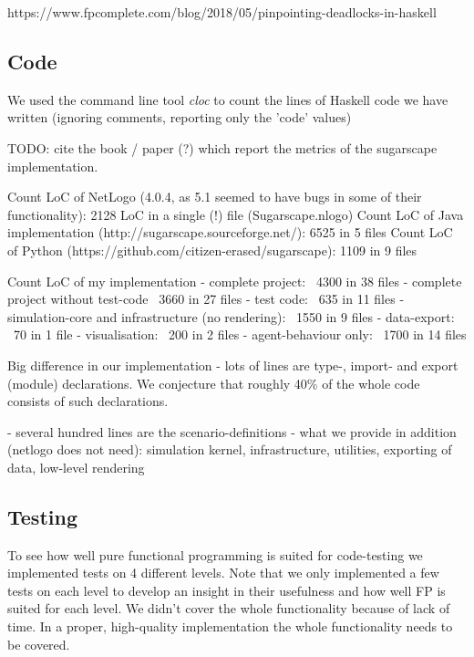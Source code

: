 https://www.fpcomplete.com/blog/2018/05/pinpointing-deadlocks-in-haskell

\subsection{Code}
We used the command line tool \textit{cloc} to count the lines of Haskell code we have written (ignoring comments, reporting only the 'code' values)

TODO: cite the book / paper  (?) which report the metrics of the sugarscape implementation.

Count LoC of NetLogo (4.0.4, as 5.1 seemed to have bugs in some of their functionality): 2128 LoC in a single (!) file (Sugarscape.nlogo)
Count LoC of Java implementation (http://sugarscape.sourceforge.net/): 6525 in 5 files
Count LoC of Python (https://github.com/citizen-erased/sugarscape): 1109 in 9 files

Count LoC of my implementation
- complete project: ~4300 in 38 files
- complete project without test-code ~3660 in 27 files
- test code: ~635 in 11 files
- simulation-core and infrastructure (no rendering): ~1550 in 9 files
- data-export: ~70 in 1 file
- visualisation: ~200 in 2 files
- agent-behaviour only: ~1700 in 14 files

Big difference in our implementation
- lots of lines are type-, import- and export (module) declarations. We conjecture that roughly 40\% of the whole code consists of such declarations.

- several hundred lines are the scenario-definitions
- what we provide in addition (netlogo does not need): simulation kernel, infrastructure, utilities, exporting of data, low-level rendering

\subsection{Testing}
To see how well pure functional programming is suited for code-testing we implemented tests on 4 different levels. Note that we only implemented a few tests on each level to develop an insight in their usefulness and how well FP is suited for each level. We didn't cover the whole functionality because of lack of time. In a proper, high-quality implementation the whole functionality needs to be covered. 

